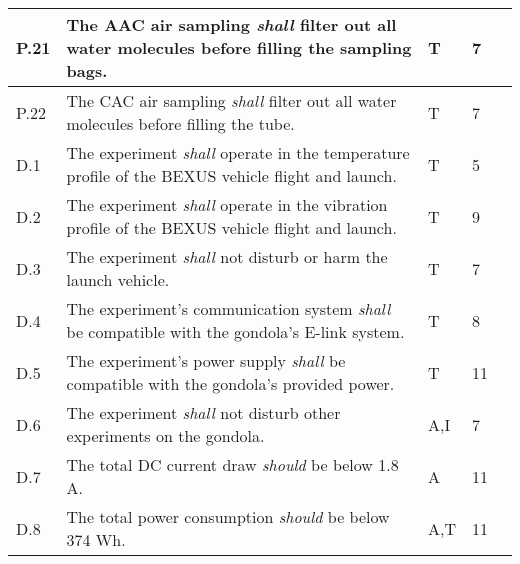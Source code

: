 \begin{longtable}[]{|m{}| m{} |m{} |m{}|m{}|}
                                                 \hline
P.21 & The AAC air sampling \textit{shall} filter out all water molecules before filling the sampling bags.                                                                             &        T      & 7            &        \\ \hline
P.22 & The CAC air sampling \textit{shall} filter out all water molecules before filling the tube.                                                                                      &         T     & 7            &        \\ \hline
D.1  & The experiment \textit{shall} operate in the temperature profile of the BEXUS vehicle flight and launch.                                                                         &       T       & 5            &        \\ \hline
D.2  & The experiment \textit{shall} operate in the vibration profile of the BEXUS vehicle flight and launch.                                                                           &       T       & 9            &        \\ \hline
D.3  & The experiment \textit{shall} not disturb or harm the launch vehicle.                                                                                                            &      T        & 7            &        \\ \hline
D.4  & The experiment's communication system \textit{shall} be compatible with the gondola's E-link system.                                                                             &      T        & 8            &        \\ \hline
D.5  & The experiment's power supply \textit{shall
} be compatible with the gondola's provided power.                                                                                    &      T        &  11           &        \\ \hline
D.6  & The experiment \textit{shall} not disturb other experiments on the gondola.                                                                                                      &       A,I       & 7            &        \\ \hline
D.7  & The total DC current draw \textit{should} be below 1.8 A.                                                                                                                        &      A        & 11            &        \\ \hline
D.8  & The total power consumption \textit{should} be below 374 Wh.                                                                                                                      &       A,T       & 11            &        \\ \hline

\end{longtable}
